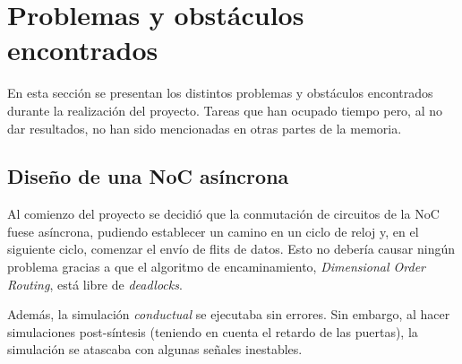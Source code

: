 
\chapter{Problemas y obstáculos encontrados}
\label{chap:problemas}

En esta sección se presentan los distintos problemas y obstáculos encontrados durante la realización del proyecto. Tareas que han ocupado tiempo pero, al no dar resultados, no han sido mencionadas en otras partes de la memoria.


\section{Diseño de una NoC asíncrona}

Al comienzo del proyecto se decidió que la conmutación de circuitos de la NoC fuese asíncrona, pudiendo establecer un camino en un ciclo de reloj y, en el siguiente ciclo, comenzar el envío de flits de datos. Esto no debería causar ningún problema gracias a que el algoritmo de encaminamiento, \textit{Dimensional Order Routing}, está libre de \textit{deadlocks}.

Además, la simulación \textit{conductual} se ejecutaba sin errores. Sin embargo, al hacer simulaciones post-síntesis (teniendo en cuenta el retardo de las puertas), la simulación se atascaba con algunas señales inestables.

